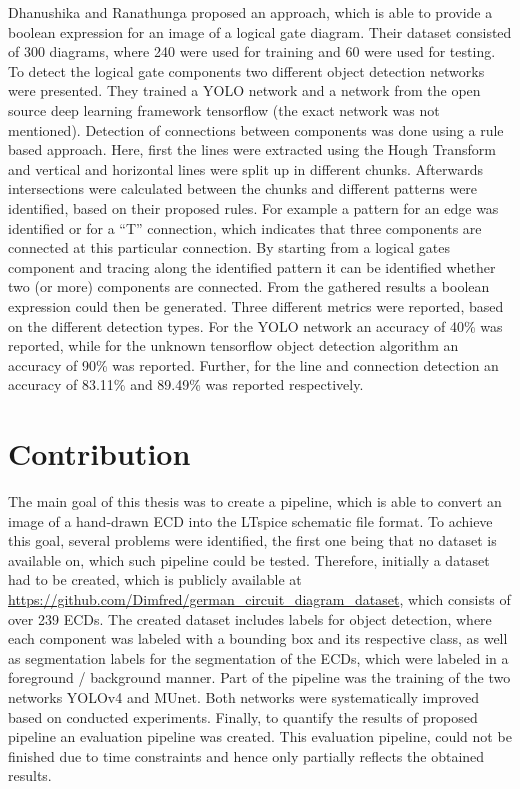 Dhanushika and Ranathunga \cite{ecd_yolobool} proposed an approach, which is able to provide a boolean expression for an image of a logical gate diagram.
Their dataset consisted of 300 diagrams, where 240 were used for training and 60 were used for testing.
To detect the logical gate components two different object detection networks were presented.
They trained a \ac{YOLO} network and a network from the open source deep learning framework tensorflow (the exact network was not mentioned).
Detection of connections between components was done using a rule based approach.
Here, first the lines were extracted using the Hough Transform and vertical and horizontal lines were split up in different chunks.
Afterwards intersections were calculated between the chunks and different patterns were identified, based on their proposed rules.
For example a pattern for an edge was identified or for a ``T'' connection, which indicates that three components are connected at this particular connection.
By starting from a logical gates component and tracing along the identified pattern it can be identified whether two (or more) components are connected.
From the gathered results a boolean expression could then be generated.
Three different metrics were reported, based on the different detection types.
For the \ac{YOLO} network an accuracy of 40\%  was reported, while for the unknown tensorflow object detection algorithm an accuracy of 90\% was reported.
Further, for the line and connection detection an accuracy of 83.11\% and 89.49\% was reported respectively.

\section{Contribution}

The main goal of this thesis was to create a pipeline, which is able to convert an image of a hand-drawn \ac{ECD} into the LTspice schematic file format.
To achieve this goal, several problems were identified, the first one being that no dataset is available on, which such pipeline could be tested.
Therefore, initially a dataset had to be created, which is publicly available at \url{https://github.com/Dimfred/german_circuit_diagram_dataset}, which consists of over 239 \acp{ECD}.
The created dataset includes labels for object detection, where each component was labeled with a bounding box and its respective class, as well as segmentation labels for the segmentation of the \acp{ECD}, which were labeled in a foreground / background manner.
Part of the pipeline was the training of the two networks \ac{YOLOv4} and \ac{MUnet}.
Both networks were systematically improved based on conducted experiments.
Finally, to quantify the results of proposed pipeline an evaluation pipeline was created.
This evaluation pipeline, could not be finished due to time constraints and hence only partially reflects the obtained results.

